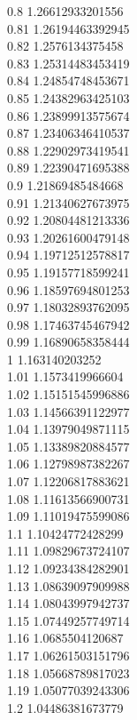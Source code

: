 {0.8	1.26612933201556\\
0.81	1.26194463392945\\
0.82	1.2576134375458\\
0.83	1.25314483453419\\
0.84	1.24854748453671\\
0.85	1.24382963425103\\
0.86	1.23899913575674\\
0.87	1.23406346410537\\
0.88	1.22902973419541\\
0.89	1.22390471695388\\
0.9	1.21869485484668\\
0.91	1.21340627673975\\
0.92	1.20804481213336\\
0.93	1.20261600479148\\
0.94	1.19712512578817\\
0.95	1.19157718599241\\
0.96	1.18597694801253\\
0.97	1.18032893762095\\
0.98	1.17463745467942\\
0.99	1.16890658358444\\
1	1.163140203252\\
1.01	1.1573419966604\\
1.02	1.15151545996886\\
1.03	1.14566391122977\\
1.04	1.13979049871115\\
1.05	1.13389820884577\\
1.06	1.12798987382267\\
1.07	1.12206817883621\\
1.08	1.11613566900731\\
1.09	1.11019475599086\\
1.1	1.10424772428299\\
1.11	1.09829673724107\\
1.12	1.09234384282901\\
1.13	1.08639097909988\\
1.14	1.08043997942737\\
1.15	1.07449257749714\\
1.16	1.0685504120687\\
1.17	1.06261503151796\\
1.18	1.05668789817023\\
1.19	1.05077039243306\\
1.2	1.04486381673779\\
}
